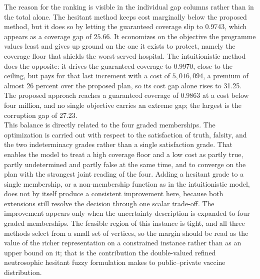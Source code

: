 \documentclass[a4paper]{elsarticle}
\begin{document}
{The reason for the ranking is visible in the individual gap columns rather than in the total alone. The hesitant method keeps cost marginally below the proposed method, but it does so by letting the guaranteed coverage slip to 0.9743, which appears as a coverage gap of $25.66$. It economizes on the objective the programme values least and gives up ground on the one it exists to protect, namely the coverage floor that shields the worst-served hospital. The intuitionistic method does the opposite: it drives the guaranteed coverage to 0.9970, close to the ceiling, but pays for that last increment with a cost of $5,016,094$, a premium of almost 26 percent over the proposed plan, so its cost gap alone rises to 31.25.\\
The proposed approach reaches a guaranteed coverage of 0.9863 at a cost below four million, and no single objective carries an extreme gap; the largest is the corruption gap of 27.23. \\
This balance is directly related to the four graded memberships. The optimization is carried out with respect to the satisfaction of truth, falsity, and the two indeterminacy grades rather than a single satisfaction grade. That enables the model to treat a high coverage floor and a low cost as partly true, partly undetermined and partly false at the same time, and to converge on the plan with the strongest joint reading of the four. Adding a hesitant grade to a single membership, or a non-membership function as in the intuitionistic model, does not by itself produce a consistent improvement here, because both extensions still resolve the decision through one scalar trade-off. The improvement appears only when the uncertainty description is expanded to four graded memberships. The feasible region of this instance is tight, and all three methods select from a small set of vertices, so the margin should be read as the value of the richer representation on a constrained instance rather than as an upper bound on it; that is the contribution the double-valued refined neutrosophic hesitant fuzzy formulation makes to public--private vaccine distribution.
}
\end{document}
